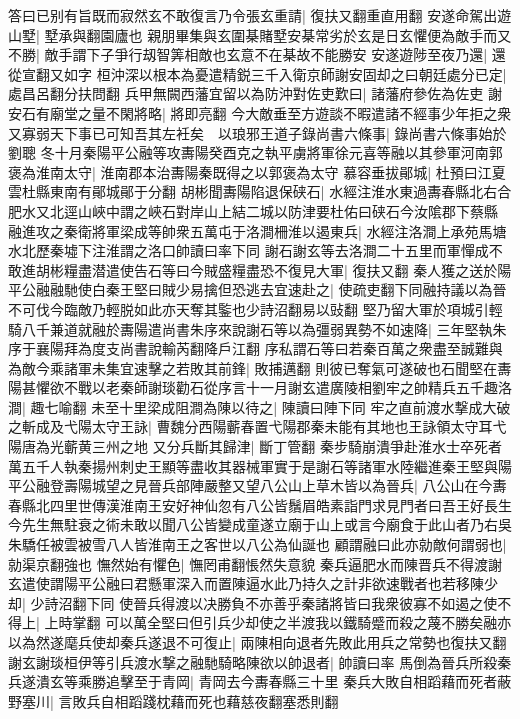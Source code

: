 答曰已别有旨既而寂然玄不敢復言乃令張玄重請|{
	復扶又翻重直用翻}
安遂命駕出遊山墅|{
	墅承與翻園廬也}
親朋畢集與玄圍棊賭墅安棊常劣於玄是日玄懼便為敵手而又不勝|{
	敵手謂下子爭行刼智筭相敵也玄意不在棊故不能勝安}
安遂遊陟至夜乃還|{
	還從宣翻又如字}
桓沖深以根本為憂遣精鋭三千入衛京師謝安固却之曰朝廷處分已定|{
	處昌呂翻分扶問翻}
兵甲無闕西藩宜留以為防沖對佐吏歎曰|{
	諸藩府參佐為佐吏}
謝安石有廟堂之量不閑將略|{
	將即亮翻}
今大敵垂至方遊談不暇遣諸不經事少年拒之衆又寡弱天下事已可知吾其左衽矣　以琅邪王道子錄尚書六條事|{
	錄尚書六條事始於劉聰}
冬十月秦陽平公融等攻夀陽癸酉克之執平虜將軍徐元喜等融以其參軍河南郭褒為淮南太守|{
	淮南郡本治夀陽秦既得之以郭褒為太守}
慕容垂拔鄖城|{
	杜預曰江夏雲杜縣東南有鄖城鄖于分翻}
胡彬聞夀陽陷退保硖石|{
	水經注淮水東過夀春縣北右合肥水又北逕山峽中謂之峽石對岸山上結二城以防津要杜佑曰硖石今汝隂郡下蔡縣}
融進攻之秦衛將軍梁成等帥衆五萬屯于洛澗柵淮以遏東兵|{
	水經注洛澗上承苑馬塘水北歷秦墟下注淮謂之洛口帥讀曰率下同}
謝石謝玄等去洛澗二十五里而軍憚成不敢進胡彬糧盡潜遣使告石等曰今賊盛糧盡恐不復見大軍|{
	復扶又翻}
秦人獲之送於陽平公融融馳使白秦王堅曰賊少易擒但恐逃去宜速赴之|{
	使疏吏翻下同融持議以為晉不可伐今臨敵乃輕脱如此亦天奪其鍳也少詩沼翻易以䜴翻}
堅乃留大軍於項城引輕騎八千兼道就融於夀陽遣尚書朱序來說謝石等以為彊弱異勢不如速降|{
	三年堅執朱序于襄陽拜為度支尚書說輸芮翻降戶江翻}
序私謂石等曰若秦百萬之衆盡至誠難與為敵今乘諸軍未集宜速擊之若敗其前鋒|{
	敗捕邁翻}
則彼已奪氣可遂破也石聞堅在夀陽甚懼欲不戰以老秦師謝琰勸石從序言十一月謝玄遣廣陵相劉牢之帥精兵五千趣洛澗|{
	趣七喻翻}
未至十里梁成阻澗為陳以待之|{
	陳讀曰陣下同}
牢之直前渡水撃成大破之斬成及弋陽太守王詠|{
	曹魏分西陽蘄春置弋陽郡秦未能有其地也王詠領太守耳弋陽唐為光蘄黄三州之地}
又分兵斷其歸津|{
	斷丁管翻}
秦步騎崩潰爭赴淮水士卒死者萬五千人執秦揚州刺史王顯等盡收其器械軍實于是謝石等諸軍水陸繼進秦王堅與陽平公融登壽陽城望之見晉兵部陣嚴整又望八公山上草木皆以為晉兵|{
	八公山在今夀春縣北四里世傳漢淮南王安好神仙忽有八公皆鬚眉皓素詣門求見門者曰吾王好長生今先生無駐衰之術未敢以聞八公皆變成童遂立廟于山上或言今廟食于此山者乃右吳朱驕任被雲被雪八人皆淮南王之客世以八公為仙誕也}
顧謂融曰此亦勍敵何謂弱也|{
	勍渠京翻強也}
憮然始有懼色|{
	憮罔甫翻悵然失意貌}
秦兵逼肥水而陳晋兵不得渡謝玄遣使謂陽平公融曰君懸軍深入而置陳逼水此乃持久之計非欲速戰者也若移陳少却|{
	少詩沼翻下同}
使晉兵得渡以决勝負不亦善乎秦諸將皆曰我衆彼寡不如遏之使不得上|{
	上時掌翻}
可以萬全堅曰但引兵少却使之半渡我以鐵騎蹙而殺之蔑不勝矣融亦以為然遂麾兵使却秦兵遂退不可復止|{
	兩陳相向退者先敗此用兵之常勢也復扶又翻}
謝玄謝琰桓伊等引兵渡水撃之融馳騎略陳欲以帥退者|{
	帥讀曰率}
馬倒為晉兵所殺秦兵遂潰玄等乘勝追擊至于青岡|{
	青岡去今夀春縣三十里}
秦兵大敗自相蹈藉而死者蔽野塞川|{
	言敗兵自相蹈踐枕藉而死也藉慈夜翻塞悉則翻}
